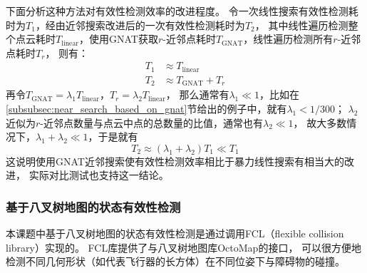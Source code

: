 下面分析这种方法对有效性检测效率的改进程度。
令一次线性搜索有效性检测耗时为$T_1$，经由近邻搜索改进后的一次有效性检测耗时为$T_2$，
其中线性遍历检测整个点云耗时$T_{\text{linear}}$，使用GNAT获取$r$-近邻点耗时$T_{\text{GNAT}}$，线性遍历检测所有$r$-近邻点耗时$T_{r}$，
则有：
\begin{align}
  T_1 &\approx T_{\text{linear}} \label{equ:time_for_linear_validity_checking} \\
  T_2 &\approx T_{\text{GNAT}} + T_r \label{equ:time_for_optimized_validity_checking}
\end{align}
再令$T_{\text{GNAT}} = \lambda_1T_{\text{linear}}$，$T_r = \lambda_2T_{\text{linear}}$，
那么通常有$\lambda_1 \ll 1$，比如在\ref{subsubsec:near_search_based_on_gnat}节给出的例子中，就有$\lambda_1 < 1/300$；
$\lambda_2$近似为$r$-近邻点数量与点云中点的总数量的比值，通常也有$\lambda_2 \ll 1$，
故大多数情况下，$\lambda_1 + \lambda_2 \ll 1$，于是就有
\begin{equation}
  T_2 \approx (\lambda_1 + \lambda_2)T_1 \ll T_1
\end{equation}
这说明使用GNAT近邻搜索使有效性检测效率相比于暴力线性搜索有相当大的改进，
实际对比测试也支持这一结论。

\subsubsection{基于八叉树地图的状态有效性检测}\label{subsubsec:vc_based_on_pcl}
本课题中基于八叉树地图的状态有效性检测是通过调用FCL（flexible collision library）\cite{pan2012fcl}实现的。
FCL库提供了与八叉树地图库OctoMap\cite{hornung2013octomap}的接口，
可以很方便地检测不同几何形状（如代表飞行器的长方体）在不同位姿下与障碍物的碰撞。

